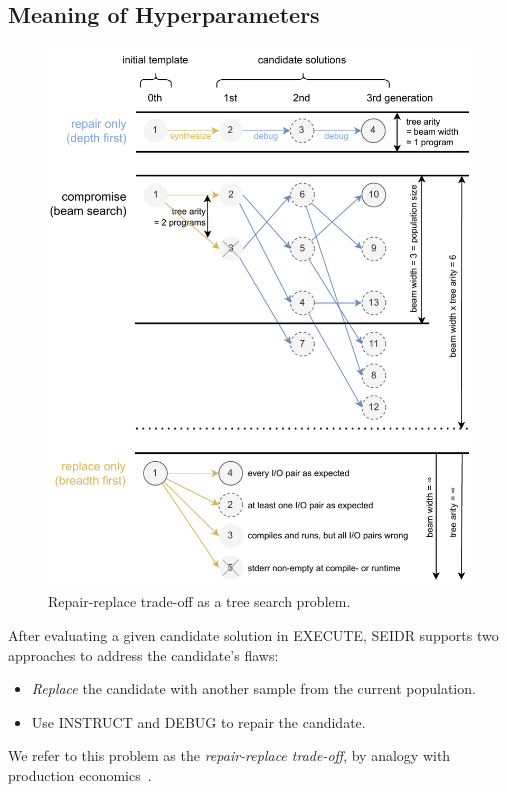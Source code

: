 \subsection{Meaning of Hyperparameters}
\label{sec:seidr-beam-search}

\begin{figure}
    \centering
    \includegraphics[width=0.7\linewidth, trim={0mm 4mm 0mm 0mm}]{images/beamsearch.pdf}
    \caption{Repair-replace trade-off as a tree search problem.}
    \label{fig:beam-search}
\end{figure}

After evaluating a given candidate solution in EXECUTE, SEIDR supports two approaches to address the candidate's flaws:
\begin{itemize}
\setlength{\parskip}{0pt}
\setlength\itemsep{0pt}
  \item \emph{Replace} the candidate with another sample from the current population.
  \item Use INSTRUCT and DEBUG to repair the candidate.
\end{itemize}
We refer to this problem as the \emph{repair-replace trade-off}, by analogy with production economics~\cite{jack2000:optimal}. 


